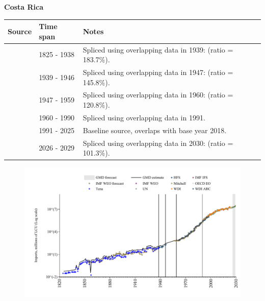 \documentclass[12pt,a4paper,landscape]{article}
\begin{document}
\begin{adjustbox}{max totalsize={\paperwidth}{\paperheight},center}
\begin{minipage}[t][\textheight][t]{\textwidth}
\vspace*{0.5cm}
{}
\begin{center}
{\Large\bfseries Costa Rica}
\end{center}
\vspace{0.5cm}
\begin{table}[H]
\centering
\small
\begin{tabular}{|l|l|l|}
\hline
\textbf{Source} & \textbf{Time span} & \textbf{Notes} \\
\hline
\rowcolor{white}\cite{Tena}& 1825 - 1938 &Spliced using overlapping data in 1939: (ratio = 183.7\%).\\
\rowcolor{lightgray}\cite{HFS}& 1939 - 1946 &Spliced using overlapping data in 1947: (ratio = 145.8\%).\\
\rowcolor{white}\cite{Mitchell}& 1947 - 1959 &Spliced using overlapping data in 1960: (ratio = 120.8\%).\\
\rowcolor{lightgray}\cite{WDI}& 1960 - 1990 &Spliced using overlapping data in 1991.\\
\rowcolor{white}\cite{OECD_EO}& 1991 - 2025 &Baseline source, overlaps with base year 2018.\\
\rowcolor{lightgray}\cite{IMF_WEO_forecast}& 2026 - 2029 &Spliced using overlapping data in 2030: (ratio = 101.3\%).\\
\hline
\end{tabular}
\end{table}
\begin{figure}[H]
\centering
\includegraphics[width=\textwidth,height=0.6\textheight,keepaspectratio]{graphs/CRI_imports.pdf}
\end{figure}
\end{minipage}
\end{adjustbox}
\end{document}
